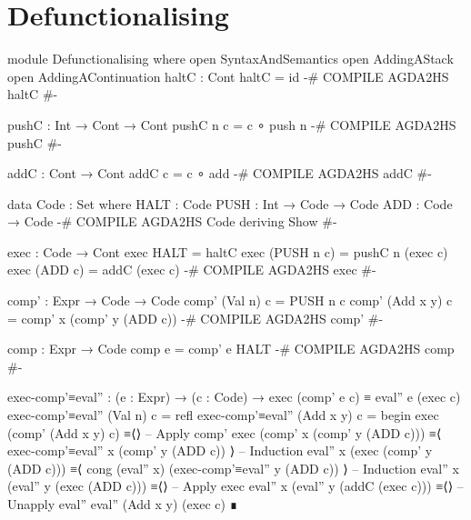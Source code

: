 \documentclass{article}
\begin{document}
\section{Defunctionalising}

\begin{code}
module Defunctionalising where
  open SyntaxAndSemantics
  open AddingAStack
  open AddingAContinuation
  haltC : Cont
  haltC = id
  {-# COMPILE AGDA2HS haltC #-}

  pushC : Int → Cont → Cont
  pushC n c = c ∘ push n
  {-# COMPILE AGDA2HS pushC #-}

  addC : Cont → Cont
  addC c = c ∘ add
  {-# COMPILE AGDA2HS addC #-}

  data Code : Set where
    HALT : Code
    PUSH : Int → Code → Code
    ADD : Code → Code
  {-# COMPILE AGDA2HS Code deriving Show #-}

  exec : Code → Cont
  exec HALT = haltC
  exec (PUSH n c) = pushC n (exec c)
  exec (ADD c) = addC (exec c)
  {-# COMPILE AGDA2HS exec #-}

  comp' : Expr → Code → Code
  comp' (Val n) c = PUSH n c
  comp' (Add x y) c = comp' x (comp' y (ADD c))
  {-# COMPILE AGDA2HS comp' #-}

  comp : Expr → Code
  comp e = comp' e HALT
  {-# COMPILE AGDA2HS comp #-}
\end{code}
\begin{code}
  exec-comp'≡eval'' : (e : Expr) → (c : Code)
    → exec (comp' e c) ≡ eval'' e (exec c)
  exec-comp'≡eval'' (Val n) c = refl
  exec-comp'≡eval'' (Add x y) c =
    begin
      exec (comp' (Add x y) c)
    ≡⟨⟩ -- Apply comp'
      exec (comp' x (comp' y (ADD c)))
    ≡⟨ exec-comp'≡eval'' x (comp' y (ADD c)) ⟩ -- Induction
      eval'' x (exec (comp' y (ADD c)))
    ≡⟨ cong (eval'' x) (exec-comp'≡eval'' y (ADD c)) ⟩ -- Induction
      eval'' x (eval'' y (exec (ADD c)))
    ≡⟨⟩ -- Apply exec
      eval'' x (eval'' y (addC (exec c)))
    ≡⟨⟩ -- Unapply eval''
      eval'' (Add x y) (exec c)
    ∎
\end{code}
\end{document}
